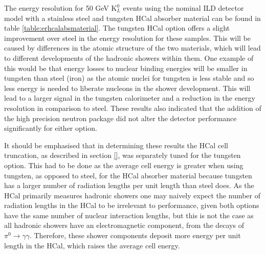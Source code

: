 The energy resolution for 50 GeV $\text{K}^{0}_{L}$ events using the nominal ILD detector model with a stainless steel and tungsten HCal absorber material can be found in table \ref{table:erhcalabsmaterial}.  The tungsten HCal option offers a slight improvement over steel in the energy resolution for these samples.  This will be caused by differences in the atomic structure of the two materials, which will lead to different developments of the hadronic showers within them.  One example of this would be that energy losses to nuclear binding energies will be smaller in tungsten than steel (iron) as the atomic nuclei for tungsten is less stable and so less energy is needed to liberate nucleons in the shower development.  This will lead to a larger signal in the tungsten calorimeter and a reduction in the energy resolution in comparison to steel.  These results also indicated that the addition of the high precision neutron package did not alter the detector performance significantly for either option.  

It should be emphasised that in determining these results the HCal cell truncation, as described in section \ref{}, was separately tuned for the tungsten option.  This had to be done as the average cell energy is greater when using tungsten, as opposed to steel, for the HCal absorber material because tungsten has a larger number of radiation lengths per unit length than steel does.  As the HCal primarily measures hadronic showers one may naively expect the number of radiation lengths in the HCal to be irrelevant to performance, given both options have the same number of nuclear interaction lengths, but this is not the case as all hadronic showers have an electromagnetic component, from the decays of $\pi^{0}\rightarrow \gamma \gamma$.  Therefore, these shower components deposit more energy per unit length in the HCal, which raises the average cell energy.  


